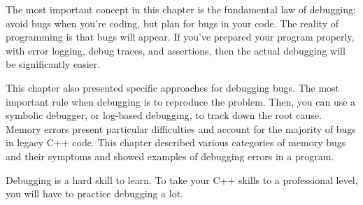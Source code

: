 The most important concept in this chapter is the fundamental law of debugging: avoid bugs when you’re coding, but plan for bugs in your code. The reality of programming is that bugs will appear. If you’ve prepared your program properly, with error logging, debug traces, and assertions, then the actual debugging will be significantly easier.

This chapter also presented specific approaches for debugging bugs. The most important rule when debugging is to reproduce the problem. Then, you can use a symbolic debugger, or log-based debugging, to track down the root cause. Memory errors present particular difficulties and account for the majority of bugs in legacy C++ code. This chapter described various categories of memory bugs and their symptoms and showed examples of debugging errors in a program.

Debugging is a hard skill to learn. To take your C++ skills to a professional level, you will have to practice debugging a lot.


